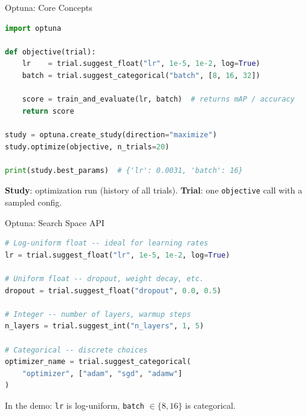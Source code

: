 \documentclass[aspectratio=169]{beamer}
\begin{document}
\begin{frame}[t,fragile]{Optuna: Core Concepts}
\vspace*{-0.6cm}
\begin{lstlisting}[language=Python, basicstyle=\footnotesize\ttfamily]
import optuna

def objective(trial):
    lr    = trial.suggest_float("lr", 1e-5, 1e-2, log=True)
    batch = trial.suggest_categorical("batch", [8, 16, 32])

    score = train_and_evaluate(lr, batch)  # returns mAP / accuracy
    return score

study = optuna.create_study(direction="maximize")
study.optimize(objective, n_trials=20)

print(study.best_params)  # {'lr': 0.0031, 'batch': 16}
\end{lstlisting}
\vspace{1mm}
\textbf{Study}: optimization run (history of all trials). \quad \textbf{Trial}: one \texttt{objective} call with a sampled config.
\end{frame}

\begin{frame}[t,fragile]{Optuna: Search Space API}
\vspace*{-0.6cm}
\begin{lstlisting}[language=Python, basicstyle=\footnotesize\ttfamily]
# Log-uniform float -- ideal for learning rates
lr = trial.suggest_float("lr", 1e-5, 1e-2, log=True)

# Uniform float -- dropout, weight decay, etc.
dropout = trial.suggest_float("dropout", 0.0, 0.5)

# Integer -- number of layers, warmup steps
n_layers = trial.suggest_int("n_layers", 1, 5)

# Categorical -- discrete choices
optimizer_name = trial.suggest_categorical(
    "optimizer", ["adam", "sgd", "adamw"]
)
\end{lstlisting}
In the demo: \texttt{lr} is log-uniform, \texttt{batch} $\in\{8, 16\}$ is categorical.
\end{frame}
\end{document}
